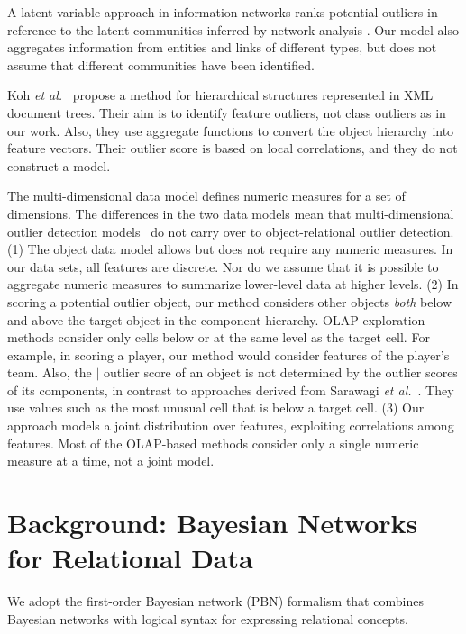 {				A latent variable approach in information networks ranks potential outliers in reference to the latent communities inferred by network analysis \citep{Gao2010}. Our model also aggregates information from entities and links of different types, but does not assume that different communities have been identified. 
				
				
				Koh {\em et al.}~\citep{Koh2008} propose a method for hierarchical structures represented in XML document trees. Their aim is to identify feature outliers, not class outliers as in our work. Also, they use aggregate functions to convert the object hierarchy into feature vectors. Their outlier score is based on local correlations, and they do not construct a model.
				
				
				The multi-dimensional data model defines numeric measures for a set of dimensions. 
				The differences in the two data models mean that multi-dimensional outlier detection models~\citep{Sarawagi1998} do not carry over to object-relational outlier detection. (1) The object data model allows but does not require any numeric measures. In our data sets, all features are discrete. Nor do we assume that it is possible to aggregate numeric measures to summarize lower-level data at higher levels.  
				(2) In scoring a potential outlier object, our method considers other objects {\em both} below and above the target object in the component hierarchy. OLAP exploration methods consider only cells below or at the same level as the target cell. For example, in scoring a player, our method would consider features of the player's team.  
				Also, the $\mid$ outlier score of an object is not determined by the outlier scores of its components, in contrast to approaches derived from Sarawagi {\em et al.}~\citep{Sarawagi1998}. They use values such as the most unusual cell that is below a target cell.
				(3) Our approach models a joint distribution over features, exploiting correlations among features. Most of the OLAP-based methods consider only a single numeric measure at a time, not a joint model.  




\section{Background: Bayesian Networks for Relational Data}
We adopt  
the first-order Bayesian network (PBN) formalism \citep{Poole2003} that combines Bayesian networks with logical syntax for expressing relational concepts. 


}
